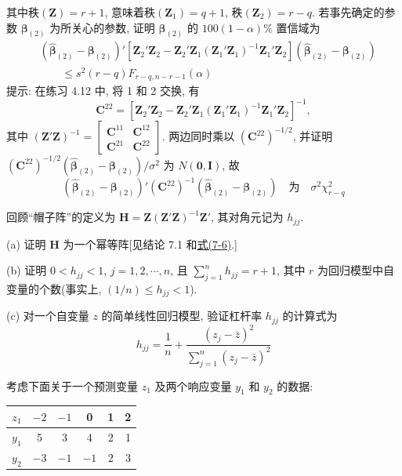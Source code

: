
其中秩$(\mathbf{Z})=r+1$, 意味着秩$(\mathbf{Z}_1)=q+1$, 秩$(\mathbf{Z}_2)=r-q$. 若事先确定的参数 $\boldsymbol{\beta}_{(2)}$ 为所关心的参数, 证明 $\boldsymbol{\beta}_{(2)}$ 的 $100(1-\alpha)\%$ 置信域为
\[
\begin{aligned}
&(\hat{\boldsymbol{\beta}}_{(2)}-\boldsymbol{\beta}_{(2)})'[\mathbf{Z}_2'\mathbf{Z}_2-\mathbf{Z}_2'\mathbf{Z}_1(\mathbf{Z}_1'\mathbf{Z}_1)^{-1}\mathbf{Z}_1'\mathbf{Z}_2](\hat{\boldsymbol{\beta}}_{(2)}-\boldsymbol{\beta}_{(2)})\\
&\qquad\leqslant s^2(r-q)F_{r-q,n-r-1}(\alpha)
\end{aligned}
\]
提示: 在练习 4.12 中, 将 1 和 2 交换, 有
\[
\mathbf{C}^{22}=[\mathbf{Z}_2'\mathbf{Z}_2-\mathbf{Z}_2'\mathbf{Z}_1(\mathbf{Z}_1'\mathbf{Z}_1)^{-1}\mathbf{Z}_1'\mathbf{Z}_2]^{-1},
\]
其中 $(\mathbf{Z}'\mathbf{Z})^{-1}=\begin{bmatrix}\mathbf{C}^{11}&\mathbf{C}^{12}\\ \mathbf{C}^{21}&\mathbf{C}^{22}\end{bmatrix}$. 两边同时乘以 $(\mathbf{C}^{22})^{-1/2}$, 并证明 $(\mathbf{C}^{22})^{-1/2}(\hat{\boldsymbol{\beta}}_{(2)}-\boldsymbol{\beta}_{(2)})/\sigma^2$ 为 $N(\mathbf{0},\mathbf{I})$, 故
\[
(\hat{\boldsymbol{\beta}}_{(2)}-\boldsymbol{\beta}_{(2)})'(\mathbf{C}^{22})^{-1}(\hat{\boldsymbol{\beta}}_{(2)}-\boldsymbol{\beta}_{(2)})\quad\text{为}\quad\sigma^2\chi_{r-q}^2
\]

\medskip
{}\quad 回顾“帽子阵”的定义为 $\mathbf{H}=\mathbf{Z}(\mathbf{Z}'\mathbf{Z})^{-1}\mathbf{Z}'$, 其对角元记为 $h_{jj}$.

\noindent (a) 证明 $\mathbf{H}$ 为一个幂等阵[见结论 7.1 和\hyperref[eq:7-6]{式(7-6)}.]

\noindent (b) 证明 $0<h_{jj}<1$, $j=1,2,\cdots,n$, 且 $\sum_{j=1}^{n}h_{jj}=r+1$, 其中 $r$ 为回归模型中自变量的个数(事实上, $(1/n)\leqslant h_{jj}<1$).

\noindent (c) 对一个自变量 $z$ 的简单线性回归模型, 验证杠杆率 $h_{jj}$ 的计算式为
\[
h_{jj}=\frac{1}{n}+\frac{(z_j-\bar{z})^2}{\sum_{j=1}^{n}(z_j-\bar{z})^2}
\]

\medskip
{}\quad 考虑下面关于一个预测变量 $z_1$ 及两个响应变量 $y_1$ 和 $y_2$ 的数据:

\begin{mvtable}
\begin{tabular}{r|ccccc}
\hline
$z_1$&$-2$&$-1$&0&1&2\\
\hline
$y_1$&5&3&4&2&1\\
\hline
$y_2$&$-3$&$-1$&$-1$&2&3\\
\hline
\end{tabular}
\end{mvtable}

